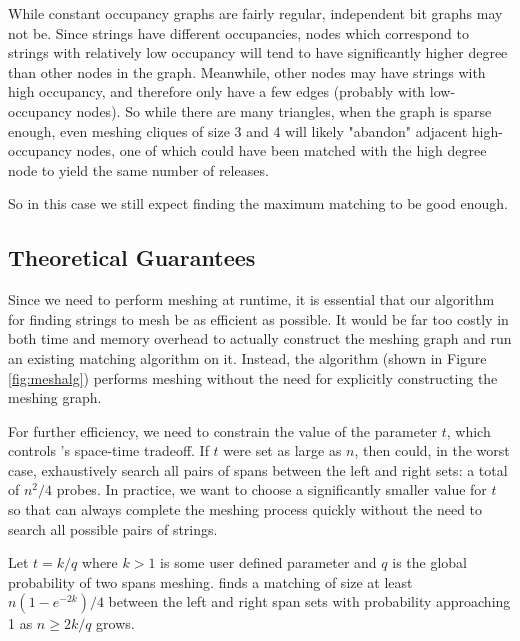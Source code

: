 While constant occupancy graphs are fairly regular, independent bit graphs may not be.  Since strings have different occupancies, nodes which correspond to strings with relatively low occupancy will tend to have significantly higher degree than other nodes in the graph.  Meanwhile, other nodes may have strings with high occupancy, and therefore only have a few edges (probably with low-occupancy nodes).  So while there are many triangles, when the graph is sparse enough, even meshing cliques of size 3 and 4 will likely "abandon" adjacent high-occupancy nodes, one of which could have been matched with the high degree node to yield the same number of releases.

So in this case we still expect finding the maximum matching to be good enough.

\subsection{Theoretical Guarantees}
\label{subsec:analysis}
Since we need to perform meshing at runtime, it is essential that our
algorithm for finding strings to mesh be as efficient as possible. It
would be far too costly in both time and memory overhead to actually
construct the meshing graph and run an existing matching algorithm on
it. Instead, the \sm algorithm (shown in Figure \ref{fig:meshalg})
performs meshing without the need for explicitly constructing the
meshing graph.

For further efficiency, we need to constrain the value of the
parameter $t$, which controls \Mesh{}'s space-time tradeoff. If $t$
were set as large as $n$, then \sm could, in the worst case,
exhaustively search all pairs of spans between the left and right
sets: a total of $n^2/4$ probes.  In practice, we want to choose a
significantly smaller value for $t$ so that \Mesh{} can always
complete the meshing process quickly without the need to search all
possible pairs of strings.


\begin{lemma}
Let $t=k/q$ where $k>1$ is some user defined parameter and $q$ is the global probability of two
spans meshing. \sm finds a matching
of size at least $n(1-e^{-2k})/4$ between the left and right span sets
with probability approaching 1 as $n\geq 2k/q$ grows.
\end{lemma}

